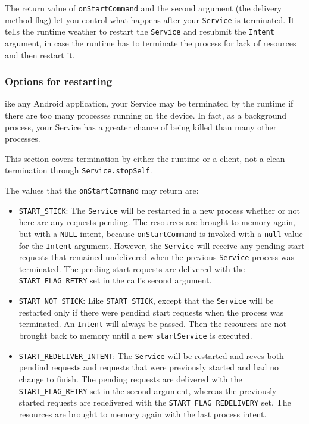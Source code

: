 The return value of \texttt{onStartCommand} and the second argument (the delivery method flag)
let you control what happens after your \texttt{Service} is terminated. It tells the runtime 
weather to restart the \texttt{Service} and resubmit the \texttt{Intent} argument, in case 
the runtime has to terminate the process for lack of resources and then restart it.

\subsubsection{Options for restarting} 
ike any Android application, your Service may be terminated by the runtime if there 
are too many processes running on the device. In fact, as a background process, your 
Service has a greater chance of being killed than many other processes.

This section covers termination by either the runtime or a client, not a clean termination 
through \texttt{Service.stopSelf}.

The values that the \texttt{onStartCommand} may return are: 
\begin{itemize}
    \item \texttt{START\_STICK}: The \texttt{Service} will be restarted in a new process whether
    or not here are any requests pending. The resources are brought to memory again, but with a 
    \texttt{NULL} intent, because \texttt{onStartCommand} is invoked with a \texttt{null} value for 
    the \texttt{Intent} argument. However, the \texttt{Service} will receive any pending start requests
    that remained undelivered when the previous \texttt{Service} process was terminated. The pending 
    start requests are delivered with the \texttt{START\_FLAG\_RETRY} set in the call's second argument. 

    \item \texttt{START\_NOT\_STICK}: Like \texttt{START\_STICK}, except that the \texttt{Service} will be 
    restarted only if there were pendind start requests when the process was terminated. An \texttt{Intent} will
    always be passed. Then the resources are not brought back to memory until a new \texttt{startService} is
    executed.
    \item \texttt{START\_REDELIVER\_INTENT}: The \texttt{Service} will be restarted and reves both pendind requests
    and requests that were previously started and had no change to finish. The pending requests are 
    delivered with the \texttt{START\_FLAG\_RETRY} set in the second argument, whereas the previously 
    started requests are redelivered with the \texttt{START\_FLAG\_REDELIVERY} set. The resources are 
    brought to memory again with the last process intent. 
\end{itemize}


